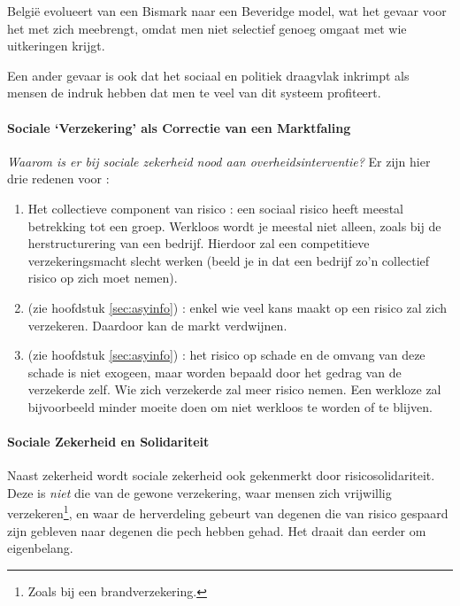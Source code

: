 \par Belgi\"e evolueert van een Bismark naar een Beveridge model, wat het gevaar voor het  met zich meebrengt, omdat men niet selectief genoeg omgaat met wie uitkeringen krijgt.
\par Een ander gevaar is ook dat het sociaal en politiek draagvlak inkrimpt als mensen de indruk hebben dat men te veel van dit systeem profiteert.

\paragraph{Sociale `Verzekering' als Correctie van een Marktfaling}

\textit{Waarom is er bij sociale zekerheid nood aan overheidsinterventie?} Er zijn hier drie redenen voor :
\begin{enumerate}
\item Het collectieve component van risico : een sociaal risico heeft meestal betrekking tot een groep. Werkloos wordt je meestal niet alleen, zoals bij de herstructurering van een bedrijf. Hierdoor zal een competitieve verzekeringsmacht slecht werken (beeld je in dat een bedrijf zo'n collectief risico op zich moet nemen).
\item {} (zie hoofdstuk \ref{sec:asyinfo}) : enkel wie veel kans maakt op een risico zal zich verzekeren. Daardoor kan de markt verdwijnen.
\item {} (zie hoofdstuk \ref{sec:asyinfo}) : het risico op schade en de omvang van deze schade is niet exogeen, maar worden bepaald door het gedrag van de verzekerde zelf. Wie zich verzekerde zal meer risico nemen. Een werkloze zal bijvoorbeeld minder moeite doen om niet werkloos te worden of te blijven.
\end{enumerate}

\paragraph{Sociale Zekerheid en Solidariteit}

Naast zekerheid wordt sociale zekerheid ook gekenmerkt door risicosolidariteit. Deze is \textit{niet} die van de gewone verzekering, waar mensen zich vrijwillig verzekeren\footnote{Zoals bij een brandverzekering.}, en waar de herverdeling gebeurt van degenen die van risico gespaard zijn gebleven naar degenen die pech hebben gehad. Het draait dan eerder om eigenbelang. \\

